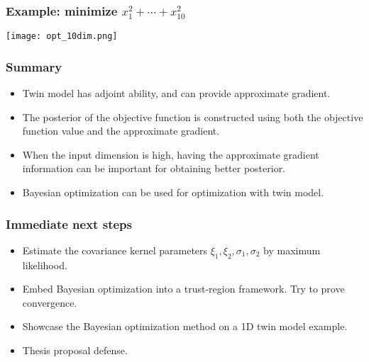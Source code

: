 \documentclass{beamer}
\begin{document}
\begin{frame}
    \frametitle{Example: minimize $x_1^2+\cdots+x_{10}^2$}
        \begin{center}
            \texttt{[image: opt\_10dim.png]}
        \end{center}
\end{frame}

\begin{frame}
    \frametitle{Summary}
    \begin{itemize}
        \item Twin model has adjoint ability, and can provide approximate gradient.
        \item The posterior of the objective function is constructed using both the objective function value
              and the approximate gradient.
        \item When the input dimension is high, having the approximate gradient information can 
              be important for obtaining better posterior.
        \item Bayesian optimization can be used for optimization with twin model.
    \end{itemize}
\end{frame}

\begin{frame}
    \frametitle{Immediate next steps}
    \begin{itemize}
        \item Estimate the covariance kernel parameters $\xi_1, \xi_2, \sigma_1,\sigma_2$ by maximum likelihood.
        \item Embed Bayesian optimization into a trust-region framework. Try to prove convergence.
        \item Showcase the Bayesian optimization method on a 1D twin model example.
        \item Thesis proposal defense.
    \end{itemize}
\end{frame}
\end{document}
